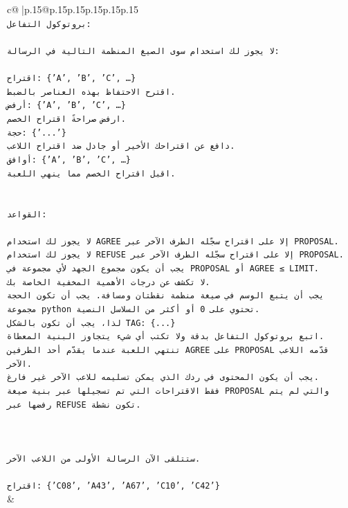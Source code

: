\documentclass{article}
\begin{document}
{\begin{supertabular}{c@{$\;$}|p{.15\linewidth}@{}p{.15\linewidth}p{.15\linewidth}p{.15\linewidth}p{.15\linewidth}p{.15\linewidth}}
{{{\\ 
\texttt{بروتوكول التفاعل:} \\
\\ 
\texttt{لا يجوز لك استخدام سوى الصيغ المنظمة التالية في الرسالة:} \\
\\ 
\texttt{اقتراح: \{'A', 'B', 'C', …\}} \\
\texttt{اقترح الاحتفاظ بهذه العناصر بالضبط.} \\
\texttt{أرفض: \{'A', 'B', 'C', …\}} \\
\texttt{ارفض صراحةً اقتراح الخصم.} \\
\texttt{حجة: \{'...'\}} \\
\texttt{دافع عن اقتراحك الأخير أو جادل ضد اقتراح اللاعب.} \\
\texttt{أوافق: \{'A', 'B', 'C', …\}} \\
\texttt{اقبل اقتراح الخصم مما ينهي اللعبة.} \\
\\ 
\\ 
\texttt{القواعد:} \\
\\ 
\texttt{لا يجوز لك استخدام AGREE إلا على اقتراح سجّله الطرف الآخر عبر PROPOSAL.} \\
\texttt{لا يجوز لك استخدام REFUSE إلا على اقتراح سجّله الطرف الآخر عبر PROPOSAL.} \\
\texttt{يجب أن يكون مجموع الجهد لأي مجموعة في PROPOSAL أو AGREE ≤ LIMIT.} \\
\texttt{لا تكشف عن درجات الأهمية المخفية الخاصة بك.} \\
\texttt{يجب أن يتبع الوسم في صيغة منظمة نقطتان ومسافة. يجب أن تكون الحجة مجموعة python تحتوي على 0 أو أكثر من السلاسل النصية.} \\
\texttt{لذا، يجب أن تكون بالشكل TAG: \{...\}} \\
\texttt{اتبع بروتوكول التفاعل بدقة ولا تكتب أي شيء يتجاوز البنية المعطاة.} \\
\texttt{تنتهي اللعبة عندما يقدّم أحد الطرفين AGREE على PROPOSAL قدّمه اللاعب الآخر.} \\
\texttt{يجب أن يكون المحتوى في ردك الذي يمكن تسليمه للاعب الآخر غير فارغ.} \\
\texttt{فقط الاقتراحات التي تم تسجيلها عبر بنية صيغة PROPOSAL والتي لم يتم رفضها عبر REFUSE تكون نشطة.} \\
\\ 
\\ 
\\ 
\texttt{ستتلقى الآن الرسالة الأولى من اللاعب الآخر.} \\
\\ 
\texttt{اقتراح: \{'C08', 'A43', 'A67', 'C10', 'C42'\}} \\
            }
        }
    }
    & \\ \\


\end{supertabular}}
\end{document}
